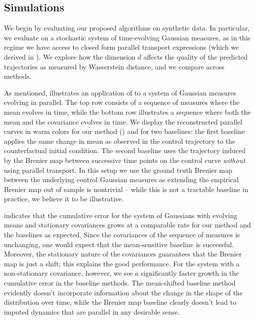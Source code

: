 \documentclass[11pt]{article}
\begin{document}
\subsection{Simulations} \label{sec: synthetic data experiments}

We begin by evaluating our proposed algorithms on synthetic data. In particular, we evaluate  on a stochastic system of time-evolving Gaussian measures, as in this regime we have access to closed form parallel transport expressions (which we derived in ). We explore how the dimension $d$ affects the quality of the predicted trajectories as measured by Wasserstein distance, and we compare across methods. 

As mentioned,  illustrates an application of  to a system of Gaussian measures evolving in parallel. The top row consists of a sequence of measures where the mean evolves in time, while the bottom row illustrates a sequence where both the mean and the covariance evolves in time. We display the reconstructed parallel curves in warm colors for our method () and for two baselines: the first baseline applies the same change in mean as observed in the control trajectory to the counterfactual initial condition. The second baseline uses the trajectory induced by the Brenier map between successive time points on the control curve \textit{without} using parallel transport. In this setup we use the ground truth Brenier map between the underlying control Gaussian measures as extending the empirical Brenier map out of sample is nontrivial -- while this is not a tractable baseline in practice, we believe it to be illustrative.

 indicates that the cumulative error for the system of Gaussians with evolving means and stationary covariances grows at a comparable rate for our method and the baselines as expected. Since the covariances of the sequence of measures is unchanging, one would expect that the mean-sensitive baseline is successful. Moreover, the stationary nature of the covariances guarantees that the Brenier map is just a shift; this explains the good performance. For the system with a non-stationary covariance, however, we see a significantly faster growth in the cumulative error in the baseline methods. The mean-shifted baseline method evidently doesn't incorporate information about the change in the shape of the distribution over time, while the Brenier map baseline clearly doesn't lead to imputed dynamics that are parallel in any desirable sense. 
\end{document}
